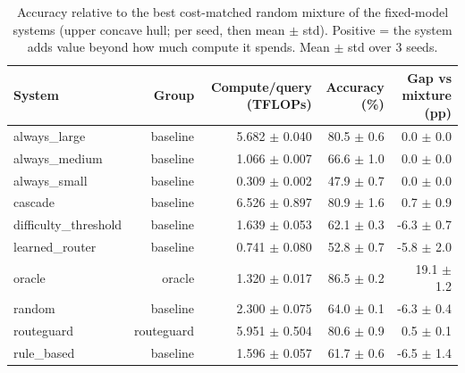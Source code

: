 \begin{table}[t]
\centering
\small
\caption{Accuracy relative to the best cost-matched random mixture of the fixed-model systems (upper concave hull; per seed, then mean $\pm$ std). Positive = the system adds value beyond how much compute it spends. Mean $\pm$ std over 3 seeds.}
\label{tab:cost_matched_mixture}
\begin{tabular}{lrrrr}
\toprule
System & Group & Compute/query (TFLOPs) & Accuracy (\%) & Gap vs mixture (pp) \\
\midrule
always\_large & baseline & 5.682 $\pm$ 0.040 & 80.5 $\pm$ 0.6 & 0.0 $\pm$ 0.0 \\
always\_medium & baseline & 1.066 $\pm$ 0.007 & 66.6 $\pm$ 1.0 & 0.0 $\pm$ 0.0 \\
always\_small & baseline & 0.309 $\pm$ 0.002 & 47.9 $\pm$ 0.7 & 0.0 $\pm$ 0.0 \\
cascade & baseline & 6.526 $\pm$ 0.897 & 80.9 $\pm$ 1.6 & 0.7 $\pm$ 0.9 \\
difficulty\_threshold & baseline & 1.639 $\pm$ 0.053 & 62.1 $\pm$ 0.3 & -6.3 $\pm$ 0.7 \\
learned\_router & baseline & 0.741 $\pm$ 0.080 & 52.8 $\pm$ 0.7 & -5.8 $\pm$ 2.0 \\
oracle & oracle & 1.320 $\pm$ 0.017 & 86.5 $\pm$ 0.2 & 19.1 $\pm$ 1.2 \\
random & baseline & 2.300 $\pm$ 0.075 & 64.0 $\pm$ 0.1 & -6.3 $\pm$ 0.4 \\
routeguard & routeguard & 5.951 $\pm$ 0.504 & 80.6 $\pm$ 0.9 & 0.5 $\pm$ 0.1 \\
rule\_based & baseline & 1.596 $\pm$ 0.057 & 61.7 $\pm$ 0.6 & -6.5 $\pm$ 1.4 \\
\bottomrule
\end{tabular}
\end{table}
